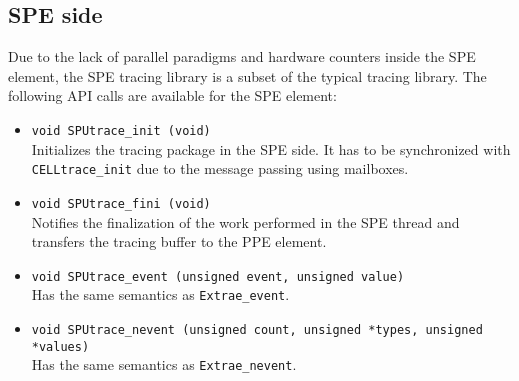 \subsection{SPE side}\label{subsec:SPEside}

Due to the lack of parallel paradigms and hardware counters inside the SPE element, the SPE tracing library is a subset of the typical tracing library. The following API calls are available for the SPE element:

\begin{itemize}

 \item {\tt void SPUtrace\_init (void)}\\
 Initializes the tracing package in the SPE side. It has to be synchronized with {\tt CELLtrace\_init} due to the message passing using mailboxes.

 \item {\tt void SPUtrace\_fini (void)}\\
 Notifies the finalization of the work performed in the SPE thread and transfers the tracing buffer to the PPE element.

 \item {\tt void SPUtrace\_event (unsigned event, unsigned value)}\\
 Has the same semantics as {\tt Extrae\_event}.

 \item {\tt void SPUtrace\_nevent (unsigned count, unsigned *types, unsigned *values)}\\
 Has the same semantics as {\tt Extrae\_nevent}.

\end{itemize}

